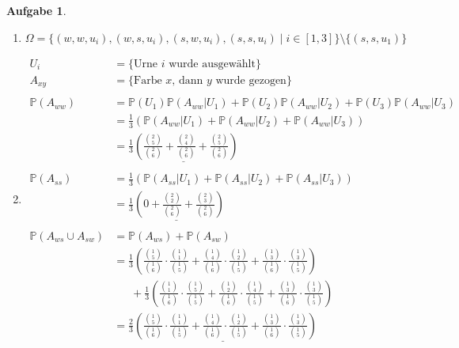 \documentclass[11pt]{article}
\theoremstyle{break}
\newtheorem{task}{Aufgabe}
\begin{document}
\begin{task}
\hfill\vspace{-5mm}
\begin{enumerate}[label={(\alph*)}]
\item $\Omega = \{(w,w,u_i),(w,s,u_i),(s,w,u_i),(s,s,u_i)\mid i\in [1,3]\}\setminus \{(s,s,u_1)\}$
\item \hfill\vspace{-5mm}\begin{align*}
U_i &= \{\text{Urne } i \text{ wurde ausgewählt}\}\\
A_{xy} &= \{\text{Farbe } x\text{, dann }y \text{ wurde gezogen}\}\\\\
\mathbb{P}(A_{ww}) &= \mathbb{P}(U_1)\mathbb{P}(A_{ww}\vert U_1) + \mathbb{P}(U_2)\mathbb{P}(A_{ww}\vert U_2) + \mathbb{P}(U_3)\mathbb{P}(A_{ww}\vert U_3)\\
&= \frac{1}{3}(\mathbb{P}(A_{ww}\vert U_1) + \mathbb{P}(A_{ww}\vert U_2) + \mathbb{P}(A_{ww}\vert U_3))\\
&= \underline{\frac{1}{3}\left(\frac{\binom{2}{5}}{\binom{2}{6}} + \frac{\binom{2}{4}}{\binom{2}{6}} + \frac{\binom{2}{5}}{\binom{2}{6}}\right)}\\\\
\mathbb{P}(A_{ss}) &= \frac{1}{3}(\mathbb{P}(A_{ss}\vert U_1) + \mathbb{P}(A_{ss}\vert U_2) + \mathbb{P}(A_{ss}\vert U_3))\\
&= \underline{\frac{1}{3}\left(0 + \frac{\binom{2}{2}}{\binom{2}{6}} + \frac{\binom{2}{3}}{\binom{2}{6}}\right)}\\\\
\mathbb{P}(A_{ws}\cup A_{sw})&= \mathbb{P}(A_{ws}) + \mathbb{P}(A_{sw})\\
&= \frac{1}{3}\left(\frac{\binom{1}{5}}{\binom{1}{6}}\cdot \frac{\binom{1}{1}}{\binom{1}{5}} + \frac{\binom{1}{4}}{\binom{1}{6}}\cdot \frac{\binom{1}{2}}{\binom{1}{5}} + \frac{\binom{1}{3}}{\binom{1}{6}}\cdot \frac{\binom{1}{3}}{\binom{1}{5}}\right)\\
&\phantom{=}\ + \frac{1}{3}\left(\frac{\binom{1}{1}}{\binom{1}{6}}\cdot \frac{\binom{1}{5}}{\binom{1}{5}} + \frac{\binom{1}{2}}{\binom{1}{6}}\cdot \frac{\binom{1}{4}}{\binom{1}{5}} + \frac{\binom{1}{3}}{\binom{1}{6}}\cdot \frac{\binom{1}{3}}{\binom{1}{5}}\right)\\
&= \underline{\frac{2}{3}\left(\frac{\binom{1}{5}}{\binom{1}{6}}\cdot \frac{\binom{1}{1}}{\binom{1}{5}} + \frac{\binom{1}{4}}{\binom{1}{6}}\cdot \frac{\binom{1}{2}}{\binom{1}{5}} + \frac{\binom{1}{3}}{\binom{1}{6}}\cdot \frac{\binom{1}{3}}{\binom{1}{5}}\right)}
\end{align*}
\end{enumerate}
\end{task}
\end{document}
